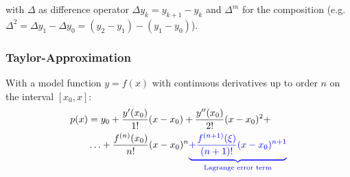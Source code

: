 with $\Delta$ as difference operator $\Delta y_k=y_{k+1} - y_k$
and $\Delta^m$ for the composition (e.g. $\Delta^2 = \Delta y_1 - \Delta y_0 = (y_2-y_1) - (y_1-y_0)$).

\subsubsection{Taylor-Approximation}

With a model function $y=f(x)$ with continuous derivatives up to order $n$ on the interval $[x_0,x]$:
\begin{align*}
    p(x) & = y_0 + \frac{y'(x_0)}{1!}(x-x_0) + \frac{y''(x_0)}{2!}(x-x_0)^2 + \\
    \ & \ldots + \frac{f^{(n)}(x_0)}{n!}(x-x_0)^n {\color{blue} \underbrace{+ \frac{f^{(n+1)}(\xi)}{(n+1)!}(x-x_0)^{n+1}}_{\text{Lagrange error term}}}
\end{align*}
